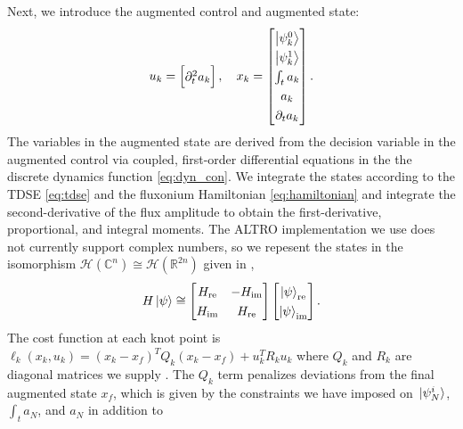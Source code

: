 Next, we introduce the augmented control and augmented state:
\begin{equation}
  \begingroup
  \renewcommand*{\arraystretch}{1.3}
  u_{k} = \begin{bmatrix} \partial^{2}_{t} a_{k} \end{bmatrix}, \quad
  x_{k} = \begin{bmatrix} \ket{\psi^{0}_{k}} \\ \ket{\psi^{1}_{k}}
    \\ \int_{t} a_{k} \\ a_{k} \\ \partial_{t} a_{k} \end{bmatrix}.
  \endgroup
  \label{eq:astatecontrols}
\end{equation}
The variables in the augmented state are derived from
the decision variable in the augmented
control via coupled, first-order differential equations in the 
the discrete dynamics function \eqref{eq:dyn_con}.
We integrate the states according to the TDSE \eqref{eq:tdse} and the
fluxonium Hamiltonian \eqref{eq:hamiltonian} and integrate
the second-derivative of the flux amplitude to obtain
the first-derivative, proportional, and integral moments.
The ALTRO implementation we use does not currently
support complex numbers, so we repesent the states
in the isomorphism $\mathcal{H}(\mathbb{C}^{n})
\cong \mathcal{H}(\mathbb{R}^{2n})$ given in \cite{leung2017speedup},
\begin{equation}
  H \ket{\psi} \cong \begin{bmatrix} H_{\textrm{re}} & -H_{\textrm{im}}
    \\ H_{\textrm{im}} & H_{\textrm{re}}\end{bmatrix}
  \begin{bmatrix} \ket{\psi}_{\textrm{re}} \\ \ket{\psi}_{\textrm{im}}\end{bmatrix}.
  \label{eq:isomorphism}
\end{equation}
The cost function at each knot point is
$\ell_{k}(x_{k}, u_{k}) = (x_{k} - x_{f})^{T} Q_{k} (x_{k} - x_{f}) + u^{T}_{k} R_{k} u_{k}$
where $Q_{k}$ and $R_{k}$ are diagonal matrices we supply
. The $Q_{k}$ term
penalizes deviations from the final augmented state $x_{f}$,
which is given by the constraints we have imposed on
$\ket*{\psi^{i}_{N}}$, $\int_{t} a_{N}$, and $a_{N}$ in addition to
